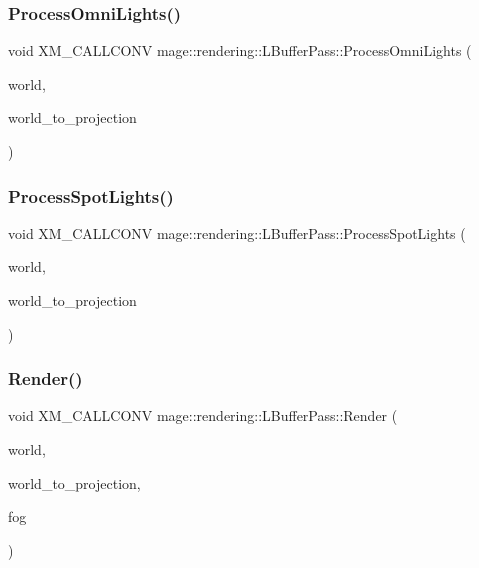 \subsubsection{\texorpdfstring{Process\+Omni\+Lights()}{ProcessOmniLights()}}
{\footnotesize\ttfamily void X\+M\+\_\+\+C\+A\+L\+L\+C\+O\+NV mage\+::rendering\+::\+L\+Buffer\+Pass\+::\+Process\+Omni\+Lights (\begin{DoxyParamCaption}\item[{const \hyperlink{classmage_1_1rendering_1_1_world}{World} \&}]{world,  }\item[{F\+X\+M\+M\+A\+T\+R\+IX}]{world\+\_\+to\+\_\+projection }\end{DoxyParamCaption})\hspace{0.3cm}{\ttfamily [private]}}

\hypertarget{classmage_1_1rendering_1_1_l_buffer_pass_a3172ee6a91c34a1dbf252c388fe1ac20}{}\label{classmage_1_1rendering_1_1_l_buffer_pass_a3172ee6a91c34a1dbf252c388fe1ac20} 
\subsubsection{\texorpdfstring{Process\+Spot\+Lights()}{ProcessSpotLights()}}
{\footnotesize\ttfamily void X\+M\+\_\+\+C\+A\+L\+L\+C\+O\+NV mage\+::rendering\+::\+L\+Buffer\+Pass\+::\+Process\+Spot\+Lights (\begin{DoxyParamCaption}\item[{const \hyperlink{classmage_1_1rendering_1_1_world}{World} \&}]{world,  }\item[{F\+X\+M\+M\+A\+T\+R\+IX}]{world\+\_\+to\+\_\+projection }\end{DoxyParamCaption})\hspace{0.3cm}{\ttfamily [private]}}

\hypertarget{classmage_1_1rendering_1_1_l_buffer_pass_af8a112e82a85455a371c496d3b1c6030}{}\label{classmage_1_1rendering_1_1_l_buffer_pass_af8a112e82a85455a371c496d3b1c6030} 
\subsubsection{\texorpdfstring{Render()}{Render()}}
{\footnotesize\ttfamily void X\+M\+\_\+\+C\+A\+L\+L\+C\+O\+NV mage\+::rendering\+::\+L\+Buffer\+Pass\+::\+Render (\begin{DoxyParamCaption}\item[{const \hyperlink{classmage_1_1rendering_1_1_world}{World} \&}]{world,  }\item[{F\+X\+M\+M\+A\+T\+R\+IX}]{world\+\_\+to\+\_\+projection,  }\item[{const \hyperlink{classmage_1_1rendering_1_1_fog}{Fog} \&}]{fog }\end{DoxyParamCaption})}

